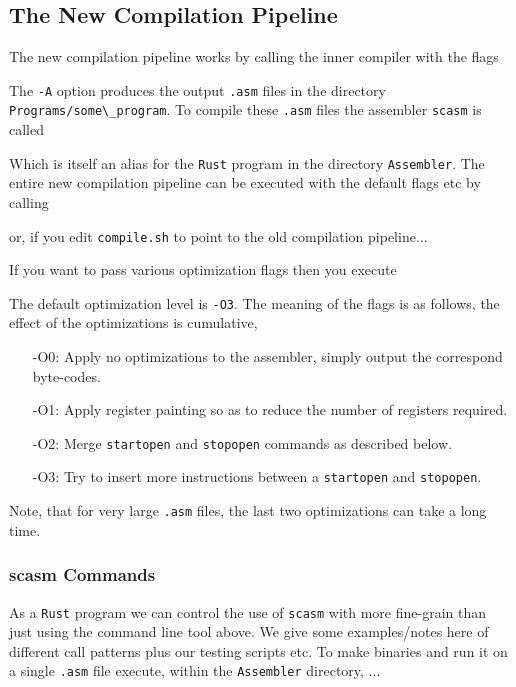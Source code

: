 \subsection{The New Compilation Pipeline}
\label{sec:newcompiler}
The new compilation pipeline works by calling the inner compiler with the flags


\noindent The \verb|-A| option produces the output \verb+.asm+ files in the directory
\verb+Programs/some\_program+.
To compile these \verb+.asm+ files the assembler \verb+scasm+ is called


\noindent Which is itself an alias for the \verb+Rust+ program in the directory \verb+Assembler+.
The entire new compilation pipeline can be executed with the default 
flags etc by calling


\noindent or, if you edit \verb+compile.sh+ to point to the old compilation
pipeline...


\noindent If you want to pass various optimization flags then you
execute


\noindent The default optimization level is \verb+-O3+.
The meaning of the flags is as follows, the effect of
the optimizations is cumulative,
\begin{itemize}
\item[-O0:] Apply no optimizations to the assembler, simply
output the correspond byte-codes.
\item[-O1:] Apply register painting so as to reduce the number
of registers required.
\item[-O2:] Merge \verb+startopen+ and \verb+stopopen+ commands
as described below.
\item[-O3:] Try to insert more instructions between a
\verb+startopen+ and \verb+stopopen+.
\end{itemize}
Note, that for very large \verb+.asm+ files, the last
two optimizations can take a long time.

\subsubsection{scasm Commands}
As a \verb+Rust+ program we can control the use of \verb+scasm+ with more fine-grain than
just using the command line tool above.
We give some examples/notes here of different call patterns plus our testing scripts etc.
To make binaries and run it on a single \verb+.asm+ file execute, within
the \verb+Assembler+ directory, ...

